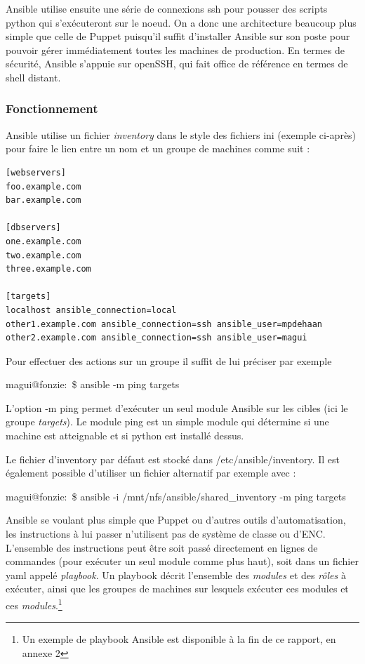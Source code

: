 \documentclass[14 pt]{extreport}
\begin{document}
Ansible utilise ensuite une série de connexions ssh pour pousser des scripts python qui s'exécuteront sur le noeud. On a donc une architecture beaucoup plus simple que celle de Puppet puisqu'il suffit d'installer Ansible sur son poste pour pouvoir gérer immédiatement toutes les machines de production. En termes de sécurité, Ansible s'appuie sur openSSH, qui fait office de référence en termes de shell distant.

\subsubsection{Fonctionnement}

Ansible utilise un fichier \emph{inventory} dans le style des fichiers ini (exemple ci-après) pour faire le lien entre un nom et un groupe de machines comme suit :
\begin{framed}
\begin{Verbatim}[fontsize=\scriptsize]
[webservers]
foo.example.com
bar.example.com

[dbservers]
one.example.com
two.example.com
three.example.com

[targets]
localhost ansible_connection=local
other1.example.com ansible_connection=ssh ansible_user=mpdehaan
other2.example.com ansible_connection=ssh ansible_user=magui
\end{Verbatim}
\end{framed}
Pour effectuer des actions sur un groupe il suffit de lui préciser par exemple \begin{framed}magui@fonzie:~\$ ansible -m ping targets\end{framed}

L'option -m ping permet d'exécuter un seul module Ansible sur les cibles (ici le groupe \emph{targets}). Le module ping est un simple module qui détermine si une machine est atteignable et si python est installé dessus.

Le fichier d'inventory par défaut est stocké dans /etc/ansible/inventory. Il est également possible d'utiliser un fichier alternatif par exemple avec :

\begin{framed}magui@fonzie:~\$ ansible -i /mnt/nfs/ansible/shared\_inventory -m ping targets\end{framed}

Ansible se voulant plus simple que Puppet ou d'autres outils d'automatisation, les instructions à lui passer n'utilisent pas de système de classe ou d'ENC. L'ensemble des instructions peut être soit passé directement en lignes de commandes (pour exécuter un seul module comme plus haut), soit dans un fichier yaml appelé \emph{playbook}. Un playbook décrit l'ensemble des \emph{modules} et des \emph{rôles} à exécuter, ainsi que les groupes de machines sur lesquels exécuter ces modules et ces \emph{modules}.\footnote{Un exemple de playbook Ansible est disponible à la fin de ce rapport, en annexe 2}
\end{document}
